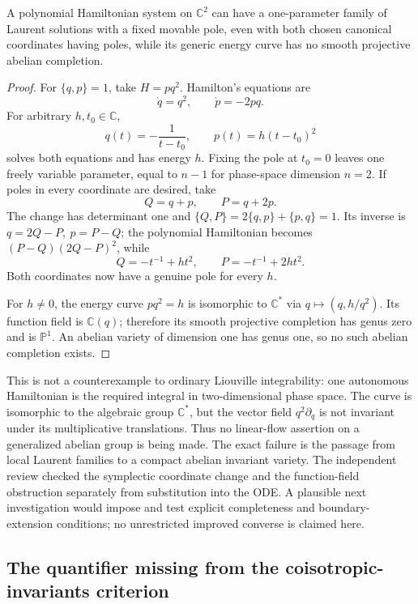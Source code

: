 \begin{proposition}\ours
A polynomial Hamiltonian system on \(\mathbb C^2\) can have a one-parameter family of Laurent solutions with a fixed movable pole, even with both chosen canonical coordinates having poles, while its generic energy curve has no smooth projective abelian completion.
\end{proposition}
\begin{proof}
For \(\{q,p\}=1\), take \(H=pq^2\). Hamilton's equations are
\[
 \dot q=q^2,\qquad \dot p=-2pq.
\]
For arbitrary \(h,t_0\in\mathbb C\),
\[
 q(t)=-\frac1{t-t_0},\qquad p(t)=h(t-t_0)^2
 \tag{D7}
\]
solves both equations and has energy \(h\). Fixing the pole at \(t_0=0\) leaves one freely variable parameter, equal to \(n-1\) for phase-space dimension \(n=2\).
If poles in every coordinate are desired, take
\[
 Q=q+p,\qquad P=q+2p .
\]
The change has determinant one and
\(\{Q,P\}=2\{q,p\}+\{p,q\}=1\).
Its inverse is \(q=2Q-P,\ p=P-Q\); the polynomial Hamiltonian becomes
\((P-Q)(2Q-P)^2\), while
\[
 Q=-t^{-1}+ht^2,\qquad P=-t^{-1}+2ht^2.
\]
Both coordinates now have a genuine pole for every \(h\).

For \(h\ne0\), the energy curve \(pq^2=h\) is isomorphic to
\(\mathbb C^*\) via \(q\mapsto(q,h/q^2)\). Its function field is
\(\mathbb C(q)\); therefore its smooth projective completion has genus zero and is \(\mathbb P^1\). An abelian variety of dimension one has genus one, so no such abelian completion exists.
\end{proof}

This is not a counterexample to ordinary Liouville integrability: one autonomous Hamiltonian is the required integral in two-dimensional phase space. The curve is isomorphic to the algebraic group \(\mathbb C^*\), but the vector field \(q^2\partial_q\) is not invariant under its multiplicative translations. Thus no linear-flow assertion on a generalized abelian group is being made. The exact failure is the passage from local Laurent families to a compact abelian invariant variety. The independent review checked the symplectic coordinate change and the function-field obstruction separately from substitution into the ODE. A plausible next investigation would impose and test explicit completeness and boundary-extension conditions; no unrestricted improved converse is claimed here.

\subsection{The quantifier missing from the coisotropic-invariants criterion}
\label{dev:coisotropic}

